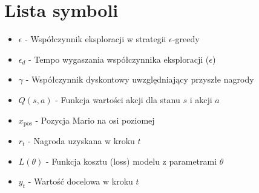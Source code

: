 \chapter*{Lista symboli}

\begin{itemize}[noitemsep,topsep=0pt,parsep=0pt,partopsep=0pt,labelwidth=1cm,align=left,itemindent=0pt]
	\item \(\epsilon\) - Współczynnik eksploracji w strategii \(\epsilon\)-greedy
	\item \(\epsilon_d\) - Tempo wygaszania współczynnika eksploracji (\(\epsilon\))
	\item \(\gamma\) - Współczynnik dyskontowy uwzględniający przyszłe nagrody
	\item \(Q(s, a)\) - Funkcja wartości akcji dla stanu \(s\) i akcji \(a\)
	\item \(x_{\text{pos}}\) - Pozycja Mario na osi poziomej
	\item \(r_t\) - Nagroda uzyskana w kroku \(t\)
	\item \(L(\theta)\) - Funkcja kosztu (loss) modelu z parametrami \(\theta\)
	\item \(y_t\) - Wartość docelowa w kroku \(t\)

\end{itemize}
